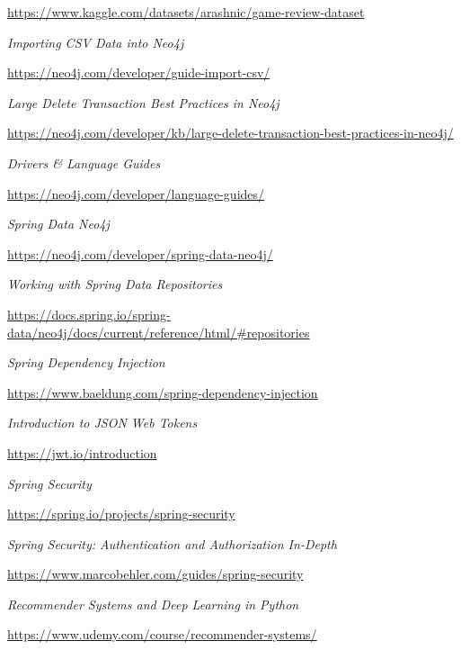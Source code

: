 \documentclass[12pt,a4paper]{report}
\begin{document}
\begin{thebibliography}{9}
  \url{https://www.kaggle.com/datasets/arashnic/game-review-dataset}
  
  
  \textit{Importing CSV Data into Neo4j}
  
  \url{https://neo4j.com/developer/guide-import-csv/}
  
  
  \textit{Large Delete Transaction Best Practices in Neo4j}
  
  \url{https://neo4j.com/developer/kb/large-delete-transaction-best-practices-in-neo4j/}
  
  
  \textit{Drivers \& Language Guides}
  
  \url{https://neo4j.com/developer/language-guides/}
  
  
  \textit{Spring Data Neo4j}
  
  \url{https://neo4j.com/developer/spring-data-neo4j/}
  
  
  \textit{Working with Spring Data Repositories}
  
  \url{https://docs.spring.io/spring-data/neo4j/docs/current/reference/html/#repositories}
  
  
  \textit{Spring Dependency Injection}
  
  \url{https://www.baeldung.com/spring-dependency-injection}
  
  
  \textit{Introduction to JSON Web Tokens}
  
  \url{https://jwt.io/introduction}
  
  
  \textit{Spring Security}
  
  \url{https://spring.io/projects/spring-security}
  
  
  \textit{Spring Security: Authentication and Authorization In-Depth}
  
  \url{https://www.marcobehler.com/guides/spring-security}
  
  
  \textit{Recommender Systems and Deep Learning in Python}
  
  \url{https://www.udemy.com/course/recommender-systems/}
  

\end{thebibliography}
\end{document}
